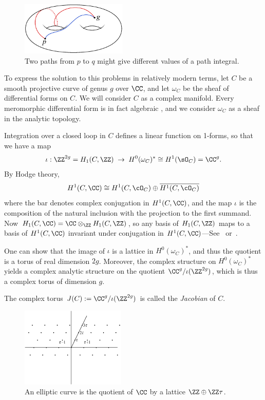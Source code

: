 \begin{figure}[htbp]
 \centerline{\includegraphics[height=1in]{"main/Fig04-1"}}
\caption{Two paths from $p$ to $q$ might give different values of a path integral.}
\end{figure}


To express the solution to this problems in relatively modern terms, let $C$ be a smooth projective curve of genus $g$ over $\CC$, and let $\omega_{C}$ be the sheaf of differential forms on $C$. We will consider $C$ as a complex manifold. Every meromorphic differential form is in fact algebraic
\cite{SerreGAGA}, and we consider $\omega_{C}$ as a sheaf in the analytic topology.

Integration over a closed loop in $C$ defines a linear function on 1-forms, so that we have a map
$$
\iota: \ZZ^{2g} = H_1(C,\ZZ) \; \to \;  H^0(\omega_C)^* \cong H^1(\sO_C) = \CC^{g}.
$$
By Hodge theory, 
$$
H^1(C, \CC) \cong H^1(C, \cO_C) \oplus \overline{H^1(C, \cO_C)}
$$
where the bar denotes complex conjugation in $H^1(C, \CC)$, and the map $\iota$ is the composition of 
 the natural inclusion with the projection to the first summand.
 Now
$H_1(C,\CC) = \CC\otimes_\ZZ H_1(C,\ZZ)$, so any basis of $H_1(C,\ZZ)$ maps to a basis of 
 $H^1(C, \CC)$ invariant under conjugation in $H^1(C, \CC)$---See~\cite{Voisin} or~\cite[p. 116]{Griffiths-Harris1978}. 

One can show that the image of $\iota$ is a lattice in $H^0(\omega_C)^*$, and thus the quotient
is a torus of real dimension $2g$. Moreover, the
complex structure on $H^0(\omega_C)^*$ yields a complex analytic structure on the quotient $\CC^{g}/\iota(\ZZ^{2g})$, which is thus a complex torus of  dimension $g$.  

\begin{definition}
 The complex torus $J(C) := \CC^{g}/\iota(\ZZ^{2g})$ is called the \emph{Jacobian} of $C$.
\end{definition}

\begin{figure}
\inprogress
\centerline{\includegraphics[height=1.5in,viewport=140 416 390 636,clip]{"main/Fig04-2"}}
\caption{An elliptic curve is the quotient of $\CC$ by a lattice $\ZZ\oplus \ZZ\tau$.}
\end{figure}



